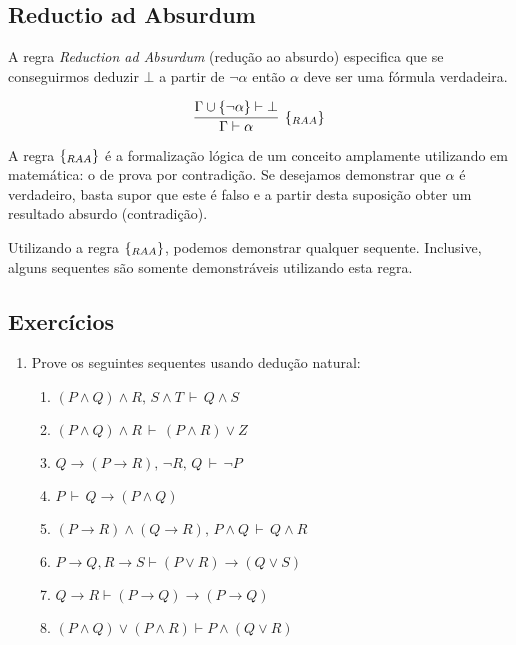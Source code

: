 \subsection{Reductio ad Absurdum}

A regra \emph{Reduction ad Absurdum} (redução ao absurdo) especifica
que se conseguirmos deduzir $\bot$ a partir de $\neg \alpha$ então $\alpha$ deve
ser uma fórmula verdadeira.

\[
    \infer[\raa]{\Gamma \vdash \alpha}
                     {\Gamma\cup\{\neg \alpha\}\vdash \bot}
\]

A regra $\scriptsize{\{_{RAA}\}}$ é a formalização lógica de um conceito amplamente
utilizando em matemática: o de prova por contradição. Se desejamos
demonstrar que $\alpha$ é verdadeiro, basta supor que este é falso e a
partir desta suposição obter um resultado absurdo (contradição).

Utilizando a regra $\scriptsize{\{_{RAA}\}}$, podemos demonstrar qualquer
sequente. Inclusive, alguns sequentes são somente demonstráveis
utilizando esta regra.

\subsection{Exerc\'icios}

\begin{enumerate}
	\item Prove os seguintes sequentes usando dedu\c{c}\~ao natural:
	\begin{enumerate}
		\item $(P\land Q)\land R,\, S\land T\,\vdash\,Q\land S$
		\item $(P\land Q)\land R\,\vdash\,(P\land R)\lor Z$
		\item $Q\rightarrow (P\rightarrow R),\, \neg R,\, Q\, \vdash\,\neg P$
		\item $P\,\vdash\, Q\rightarrow(P\land Q)$
		\item $(P\rightarrow R)\land (Q\rightarrow R),\, P\land Q\,\vdash\, Q\land R$
		\item $P\rightarrow Q, R\rightarrow S\vdash (P\lor R)\rightarrow (Q\lor S)$
		\item $Q\rightarrow R\vdash (P\rightarrow Q)\rightarrow(P\rightarrow Q)$
		\item $(P\land Q)\lor(P\land R)\vdash P\land(Q\lor R)$
	\end{enumerate}
\end{enumerate}